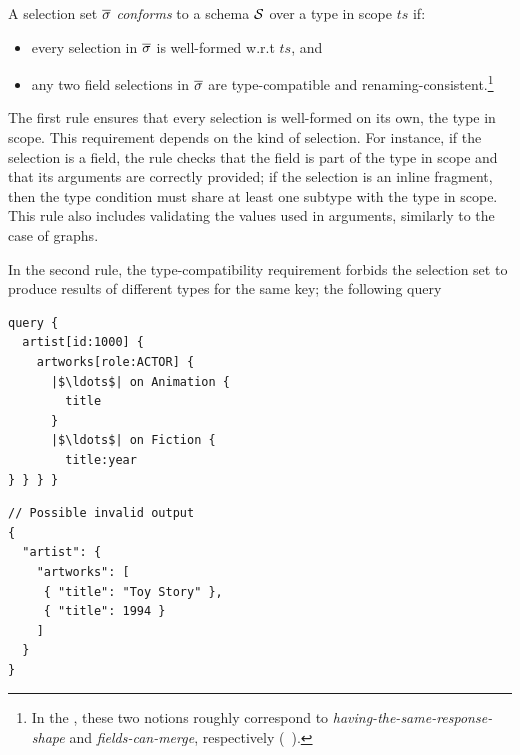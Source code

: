 \begin{definition}
A \gql selection set $\overline{\sigma}$ \textit{conforms} to a schema $\mathcal{S}$
over a type in scope $\mathit{ts}$ if:
\begin{itemize}
\item every selection in $\overline{\sigma}$ is well-formed w.r.t $\mathit{ts}$, and

\item any two field selections in $\overline{\sigma}$
  are type-compatible and
  renaming-consistent.\footnote{In the \spec, these two notions roughly correspond     to \emph{having-the-same-response-shape} and
    \emph{fields-can-merge}, respectively (\cf~\cite[\S5.3.2]{gqlspec}).}
\end{itemize}
\end{definition}


The first rule ensures that every selection is well-formed on its own,
\wrt the type in scope. This requirement depends on the
kind of selection. For instance, if the selection is a field, the rule
checks that the field is part of the type in scope and that its
arguments are correctly provided; if the selection is an inline
fragment, then the type condition must share at least one subtype with
the type in scope. This rule also includes validating the values used
in arguments, similarly to the case of graphs.

In the second rule, the type-compatibility requirement forbids the
selection set to produce results of different types for the same key; \eg the following query

\smallskip

\begin{minipage}[t]{.22\textwidth}
\begin{verbatim}
query {
  artist[id:1000] {
    artworks[role:ACTOR] {
      |$\ldots$| on Animation {
        title
      }
      |$\ldots$| on Fiction {
        title:year
} } } }
\end{verbatim}
\end{minipage}%
\begin{minipage}[t]{.22\textwidth}
\begin{verbatim}
// Possible invalid output
{
  "artist": {
    "artworks": [
     { "title": "Toy Story" },
     { "title": 1994 }
    ]
  }
}
\end{verbatim}
\end{minipage}

